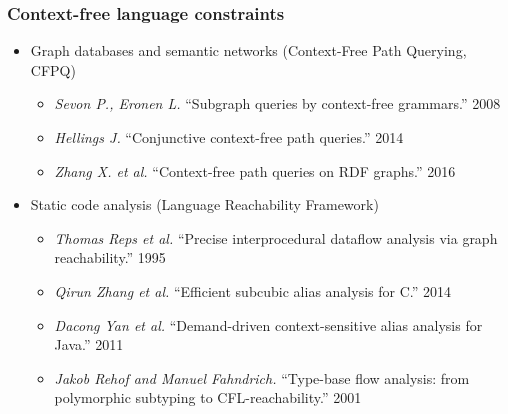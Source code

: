 \documentclass[xcolor=table]{beamer}
\begin{document}
\begin{frame}[fragile]
  \transwipe[direction=90]
  \frametitle{Context-free language constraints}
  \begin{itemize}
  \item Graph databases and semantic networks (Context-Free Path Querying, CFPQ)
    \begin{itemize}
        \item \emph{Sevon P., Eronen L.} ``Subgraph queries by context-free grammars.'' 2008
        \item \emph{Hellings J.} ``Conjunctive context-free path queries.'' 2014
        \item \emph{Zhang X. et al.} ``Context-free path queries on RDF graphs.'' 2016
    \end{itemize}
    \item Static code analysis (Language Reachability Framework)
    \begin{itemize}
        \item \emph{Thomas Reps et al.} ``Precise interprocedural dataflow analysis via graph reachability.'' 1995 
        \item \emph{Qirun Zhang et al.}  ``Efficient subcubic alias analysis for C.'' 2014
        \item \emph{Dacong Yan et al.} ``Demand-driven context-sensitive alias analysis for Java.'' 2011
        \item \emph{Jakob Rehof and Manuel Fahndrich.} ``Type-base flow analysis: from polymorphic subtyping to CFL-reachability.'' 2001
    \end{itemize}
  \end{itemize}
\end{frame}


%
%  
%
%
\end{document}
